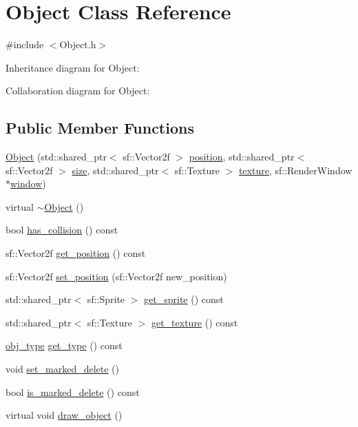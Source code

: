 \hypertarget{classObject}{}\section{Object Class Reference}
\label{classObject}


{\ttfamily \#include $<$Object.\+h$>$}



Inheritance diagram for Object\+:


Collaboration diagram for Object\+:
\subsection*{Public Member Functions}
\begin{DoxyCompactItemize}
\item 
\hyperlink{classObject_aa4f8406457e3a63439718536e4c9261e}{Object} (std\+::shared\+\_\+ptr$<$ sf\+::\+Vector2f $>$ \hyperlink{classObject_a8b1724482fb412feb64a638038161b7a}{position}, std\+::shared\+\_\+ptr$<$ sf\+::\+Vector2f $>$ \hyperlink{classObject_ac8bfde5d0428d9c091854fe1a09b7d9f}{size}, std\+::shared\+\_\+ptr$<$ sf\+::\+Texture $>$ \hyperlink{classObject_a8ff6491b841d0f48da3d98041fbca934}{texture}, sf\+::\+Render\+Window $\ast$\hyperlink{classObject_a5c6cfc086ea1e39e0b3cf8633a763bf8}{window})
\item 
virtual \hyperlink{classObject_ae8f5483f459e46687bd01e6f9977afd3}{$\sim$\+Object} ()
\item 
bool \hyperlink{classObject_a5813543f4d10da55932ed5dafb82816f}{has\+\_\+collision} () const
\item 
sf\+::\+Vector2f \hyperlink{classObject_a7572a917cf526e55be00ebb51633f9d6}{get\+\_\+position} () const
\item 
sf\+::\+Vector2f \hyperlink{classObject_a121d4f9b1f359924d6a2cf77a1d0db52}{set\+\_\+position} (sf\+::\+Vector2f new\+\_\+position)
\item 
std\+::shared\+\_\+ptr$<$ sf\+::\+Sprite $>$ \hyperlink{classObject_a1a7f0c8e9026cbc075d3b34a96541a15}{get\+\_\+sprite} () const
\item 
std\+::shared\+\_\+ptr$<$ sf\+::\+Texture $>$ \hyperlink{classObject_ad41bf244fcffe688f67d7d4a3005a05c}{get\+\_\+texture} () const
\item 
\hyperlink{Object_8h_ac87c026b772bad1b7bb6edea6200fc92}{obj\+\_\+type} \hyperlink{classObject_ae80b139cddd1174e4fa87255df3c90c3}{get\+\_\+type} () const
\item 
void \hyperlink{classObject_a81f2978454364d1891861b24473ef3a8}{set\+\_\+marked\+\_\+delete} ()
\item 
bool \hyperlink{classObject_a31751928d2d716780fe65d02681e1f42}{is\+\_\+marked\+\_\+delete} () const
\item 
virtual void \hyperlink{classObject_a87b1a93e287279985c45941c3e78fed4}{draw\+\_\+object} ()
\end{DoxyCompactItemize}

